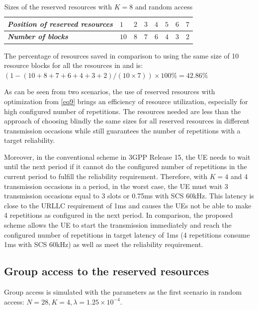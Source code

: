 \documentclass[conference]{IEEEtran}
\begin{document}
\begin{table}[htbp]
\caption{Sizes of the reserved resources with $K=8$ and random access}
\begin{center}
\begin{tabular}{|p{5em}|p{2em}|p{2em}|p{2em}|p{2em}|p{2em}|p{2em}|p{2em}|}
 \hline
 \textbf{\textit{Position of reserved resources}} & $1$ &$2$ &$3$ & $4$ &$5$ &$6$ &$7$\\ 
 \hline
 \textbf{\textit{Number of blocks}} & $10$ &$8$ &$7$ & $6$ &$4$ &$3$ &$2$\\

 
 \hline
\end{tabular}
\label{tab2}
\end{center}
\vspace{-4mm}
\end{table}

The percentage of resources saved in comparison to using the same size of 10 resource blocks for all the resources in \cite{b5} and \cite{b7} is: $(1 - (10+8+7+6+4+3+2)/(10\times7)) \times100\% = 42.86\%$

As can be seen from two scenarios, the use of reserved resources with optimization from \eqref{eq9} brings an efficiency of resource utilization, especially for high configured number of repetitions. The resources needed are less than the approach of choosing blindly the same sizes for all reserved resources in different transmission occasions while still guarantees the number of repetitions with a target reliability.

Moreover, in the conventional scheme in 3GPP Release 15, the UE needs to wait until the next period if it cannot do the configured number of repetitions in the current period to fulfill the reliability requirement. Therefore, with $K=4$ and 4 transmission occasions in a period, in the worst case, the UE must wait 3 transmission occasions equal to 3 slots or 0.75ms with SCS 60kHz. This latency is close to the URLLC requirement of 1ms and causes the UEs not be able to make 4 repetitions as configured in the next period. In comparison, the proposed scheme allows the UE to start the transmission immediately and reach the configured number of repetitions in target latency of 1ms (4 repetitions consume 1ms with SCS 60kHz) as well as meet the reliability requirement.

\subsection{Group access to the reserved resources}\label{IIIBB}
Group access is simulated with the parameters as the first scenario in random access: $N = 28, K = 4, \lambda = 1.25\times10^{-4}$.
\end{document}
